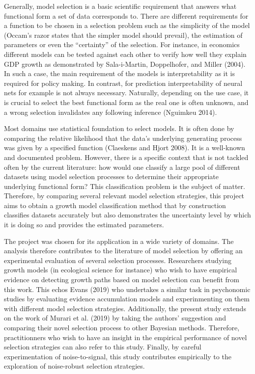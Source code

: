 \documentclass[12pt,]{article}
\begin{document}
Generally, model selection is a basic scientific requirement that answers what functional form a set of data corresponds to. There are different requirements for a function to be chosen in a selection problem such as the simplicity of the model (Occam's razor states that the simpler model should prevail), the estimation of parameters or even the ``certainty'' of the selection. For instance, in economics different models can be tested against each other to verify how well they explain GDP growth as demonstrated by Sala-i-Martin, Doppelhofer, and Miller (2004). In such a case, the main requirement of the models is interpretability as it is required for policy making. In contrast, for prediction interpretability of neural nets for example is not always necessary. Naturally, depending on the use case, it is crucial to select the best functional form as the real one is often unknown, and a wrong selection invalidates any following inference (Nguimkeu 2014).

Most domains use statistical foundation to select models. It is often done by comparing the relative likelihood that the data's underlying generating process was given by a specified function (Claeskens and Hjort 2008). It is a well-known and documented problem. However, there is a specific context that is not tackled often by the current literature: how would one classify a large pool of different datasets using model selection processes to determine their appropriate underlying functional form? This classification problem is the subject of matter. Therefore, by comparing several relevant model selection strategies, this project aims to obtain a growth model classification method that by construction classifies datasets accurately but also demonstrates the uncertainty level by which it is doing so and provides the estimated parameters.

The project was chosen for its application in a wide variety of domains. The analysis therefore contributes to the literature of model selection by offering an experimental evaluation of several selection processes. Researchers studying growth models (in ecological science for instance) who wish to have empirical evidence on detecting growth paths based on model selection can benefit from this work. This echos Evans (2019) who undertakes a similar task in psychonomic studies by evaluating evidence accumulation models and experinmenting on them with different model selection strategies. Additionally, the present study extends on the work of Murari et al. (2019) by taking the authors' suggestion and comparing their novel selection process to other Bayesian methods. Therefore, practitionners who wish to have an insight in the empirical performance of novel selection strategies can also refer to this study. Finally, by careful experimentation of noise-to-signal, this study contributes empirically to the exploration of noise-robust selection strategies.
\end{document}

